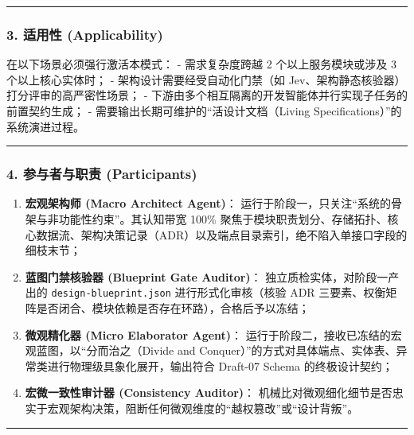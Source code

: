 \begin{center}\rule{0.5\linewidth}{0.5pt}\end{center}

\subsubsection{3. 适用性
(Applicability)}\label{ux9002ux7528ux6027-applicability-4}

在以下场景必须强行激活本模式： - 需求复杂度跨越 2 个以上服务模块或涉及 3
个以上核心实体时； - 架构设计需要经受自动化门禁（如
Jev、架构静态核验器）打分评审的高严密性场景； -
下游由多个相互隔离的开发智能体并行实现子任务的前置契约生成； -
需要输出长期可维护的``活设计文档（Living
Specifications）''的系统演进过程。

\begin{center}\rule{0.5\linewidth}{0.5pt}\end{center}

\subsubsection{4. 参与者与职责
(Participants)}\label{ux53c2ux4e0eux8005ux4e0eux804cux8d23-participants-4}

\begin{enumerate}
\def\labelenumi{\arabic{enumi}.}
\tightlist
\item
  \textbf{宏观架构师 (Macro Architect Agent)}：
  运行于阶段一，只关注``系统的骨架与非功能性约束''。其认知带宽 100\%
  聚焦于模块职责划分、存储拓扑、核心数据流、架构决策记录（ADR）以及端点目录索引，绝不陷入单接口字段的细枝末节；
\item
  \textbf{蓝图门禁核验器 (Blueprint Gate Auditor)}：
  独立质检实体，对阶段一产出的 \texttt{design-blueprint.json}
  进行形式化审核（核验 ADR
  三要素、权衡矩阵是否闭合、模块依赖是否存在环路），合格后予以冻结；
\item
  \textbf{微观精化器 (Micro Elaborator Agent)}：
  运行于阶段二，接收已冻结的宏观蓝图，以``分而治之（Divide and
  Conquer）''的方式对具体端点、实体表、异常类进行物理级具象化展开，输出符合
  Draft-07 Schema 的终极设计契约；
\item
  \textbf{宏微一致性审计器 (Consistency Auditor)}：
  机械比对微观细化细节是否忠实于宏观架构决策，阻断任何微观维度的``越权篡改''或``设计背叛''。
\end{enumerate}

\begin{center}\rule{0.5\linewidth}{0.5pt}\end{center}


